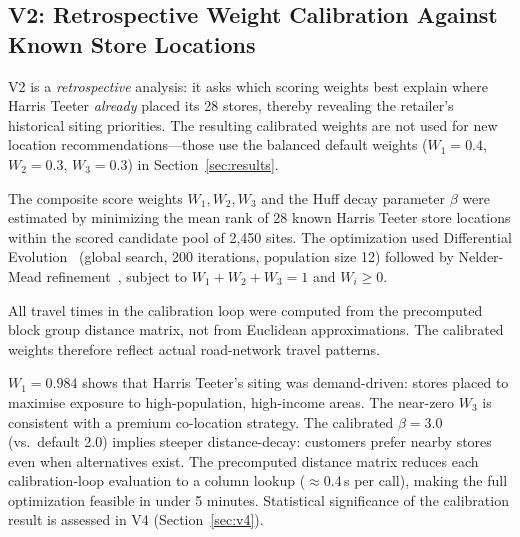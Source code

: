 \documentclass[conference]{IEEEtran}
\begin{document}
\subsection{V2: Retrospective Weight Calibration Against Known Store Locations}
\label{sec:v2}

V2 is a \emph{retrospective} analysis: it asks which scoring weights
best explain where Harris Teeter \emph{already} placed its 28 stores,
thereby revealing the retailer's historical siting priorities.  The
resulting calibrated weights are not used for new location
recommendations---those use the balanced default weights
($W_1=0.4$, $W_2=0.3$, $W_3=0.3$) in Section~\ref{sec:results}.

The composite score weights $W_1, W_2, W_3$ and the Huff decay
parameter $\beta$ were estimated by minimizing the mean rank of 28
known Harris Teeter store locations within the scored candidate pool
of 2{,}450 sites.  The optimization used Differential
Evolution~\cite{Storn1997} (global search, 200 iterations, population
size 12) followed by Nelder-Mead refinement~\cite{Nelder1965},
subject to $W_1 + W_2 + W_3 = 1$ and $W_i \geq 0$.

All travel times in the calibration loop were computed from the
precomputed block group distance matrix, not from Euclidean
approximations.  The calibrated weights therefore reflect actual
road-network travel patterns.

\begin{table}[!t]
\centering
\caption{V2: Calibrated Weights \& Configuration Comparison (28 HT stores, 2,450 candidates)}
\label{tab:v2_weights}
\end{table}

$W_1 = 0.984$ shows that Harris Teeter's siting was demand-driven: stores placed to maximise exposure to high-population, high-income areas.  The near-zero $W_3$ is consistent with a premium co-location strategy.  The calibrated $\beta = 3.0$ (vs.\ default 2.0) implies steeper distance-decay: customers prefer nearby stores even when alternatives exist.  The precomputed distance matrix reduces each calibration-loop evaluation to a column lookup ($\approx$0.4\,s per call), making the full optimization feasible in under 5 minutes.  Statistical significance of the calibration result is assessed in V4 (Section~\ref{sec:v4}).
\end{document}
